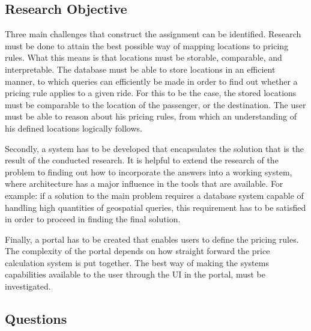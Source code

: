 \subsection{Research Objective}
Three main challenges that construct the assignment can be identified. Research must be done to attain the best possible way of mapping locations to pricing rules. What this means is that locations must be storable, comparable, and interpretable. The database must be able to store locations in an efficient manner, to which queries can efficiently be made in order to find out whether a pricing rule applies to a given ride. For this to be the case, the stored locations must be comparable to the location of the passenger, or the destination. The user must be able to reason about his pricing rules, from which an understanding of his defined locations logically follows.

Secondly, a system has to be developed that encapsulates the solution that is the result of the conducted research. It is helpful to extend the research of the problem to finding out how to incorporate the answers into a working system, where architecture has a major influence in the tools that are available. For example: if a solution to the main problem requires a database system capable of handling high quantities of geospatial queries, this requirement has to be satisfied in order to proceed in finding the final solution.

Finally, a portal has to be created that enables users to define the pricing rules. The complexity of the portal depends on how straight forward the price calculation system is put together. The best way of making the systems capabilities available to the user through the UI in the portal, must be investigated.

\subsection{Questions}

